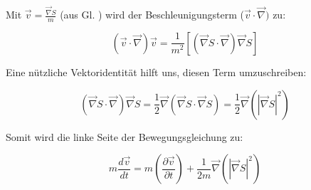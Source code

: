 Mit $\vec{v} = \frac{\vec{\nabla} S}{m}$ (aus Gl. ) wird der Beschleunigungsterm ($\vec{v} \cdot \vec{\nabla})$ zu:

\begin{equation}
    (\vec{v} \cdot \vec{\nabla}) \vec{v} = \frac{1}{m^2} \left[ (\vec{\nabla} S \cdot \vec{\nabla}) \vec{\nabla} S \right]
\end{equation}

Eine nützliche Vektoridentität hilft uns, diesen Term umzuschreiben:

\begin{equation}
    (\vec{\nabla} S \cdot \vec{\nabla}) \vec{\nabla} S = \frac{1}{2} \vec{\nabla} (\vec{\nabla} S \cdot \vec{\nabla} S) = \frac{1}{2} \vec{\nabla} (\left|\vec{\nabla} S \right|^2)
\end{equation}

Somit wird die linke Seite der Bewegungsgleichung zu:

\begin{equation}
    m \frac{d\vec{v}}{dt} = m \left( \frac{\partial \vec{v}}{\partial t} \right) + \frac{1}{2m} \vec{\nabla} (\left| \vec{\nabla} S \right|^2)
\end{equation}
